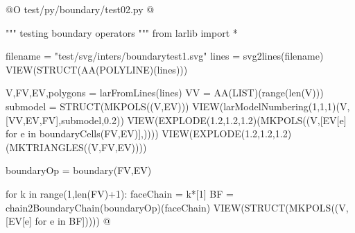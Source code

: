 \documentclass[11pt,oneside]{article}	%
\begin{document}
@O test/py/boundary/test02.py
@{""" testing boundary operators """
from larlib import *

filename = "test/svg/inters/boundarytest1.svg"
lines = svg2lines(filename)
VIEW(STRUCT(AA(POLYLINE)(lines)))
    
V,FV,EV,polygons = larFromLines(lines)
VV = AA(LIST)(range(len(V)))
submodel = STRUCT(MKPOLS((V,EV)))
VIEW(larModelNumbering(1,1,1)(V,[VV,EV,FV],submodel,0.2))
VIEW(EXPLODE(1.2,1.2,1.2)(MKPOLS((V,[EV[e] for e in boundaryCells(FV,EV)],))))
VIEW(EXPLODE(1.2,1.2,1.2)(MKTRIANGLES((V,FV,EV))))

boundaryOp = boundary(FV,EV)

for k in range(1,len(FV)+1):
    faceChain = k*[1]
    BF = chain2BoundaryChain(boundaryOp)(faceChain)
    VIEW(STRUCT(MKPOLS((V,[EV[e] for e in BF]))))
@}
\end{document}
